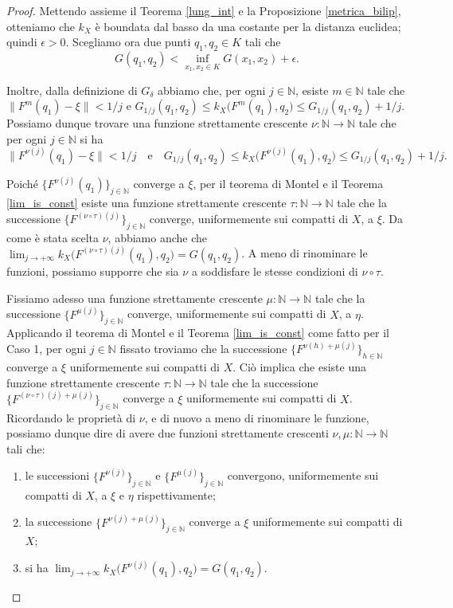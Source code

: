 \begin{proof}
    Mettendo assieme il Teorema \ref{lung_int} e la Proposizione \ref{metrica_bilip}, otteniamo che $k_X$ è boundata dal basso da una costante per la distanza euclidea; quindi $\epsilon>0$. Scegliamo ora due punti $q_1,q_2 \in K$ tali che
    $$G(q_1,q_2)<\inf_{x_1,x_2\in K}G(x_1,x_2)+\epsilon.$$
    
    Inoltre, dalla definizione di $G_{\delta}$ abbiamo che, per ogni $j\in\mathbb{N}$, esiste $m\in\mathbb{N}$ tale che $\|F^m(q_1)-\xi\|<1/j$ e $G_{1/j}(q_1,q_2) \le k_X\big(F^m(q_1),q_2\big) \le G_{1/j}(q_1,q_2)+1/j$. Possiamo dunque trovare una funzione strettamente crescente $\nu:\mathbb{N}\longrightarrow\mathbb{N}$ tale che per ogni $j\in\mathbb{N}$ si ha
    $$\|F^{\nu(j)}(q_1)-\xi\|<1/j \quad\text{e}\quad G_{1/j}(q_1,q_2) \le k_X\big(F^{\nu(j)}(q_1),q_2\big) \le G_{1/j}(q_1,q_2)+1/j.$$

    Poiché $\{F^{\nu(j)}(q_1)\}_{j\in\mathbb{N}}$ converge a $\xi$, per il teorema di Montel e il Teorema \ref{lim_is_const} esiste una funzione strettamente crescente $\tau:\mathbb{N}\longrightarrow\mathbb{N}$ tale che la successione $\{F^{(\nu\circ\tau)(j)}\}_{j\in\mathbb{N}}$ converge, uniformemente sui compatti di $X$, a $\xi$. Da come è stata scelta $\nu$, abbiamo anche che $\displaystyle\lim_{j\longrightarrow+\infty}k_X\big(F^{(\nu\circ\tau)(j)}(q_1),q_2\big)=G(q_1,q_2)$. A meno di rinominare le funzioni, possiamo supporre che sia $\nu$ a soddisfare le stesse condizioni di $\nu\circ\tau$.

    Fissiamo adesso una funzione strettamente crescente $\mu:\mathbb{N}\longrightarrow\mathbb{N}$ tale che la successione $\{F^{\mu(j)}\}_{j\in\mathbb{N}}$ converge, uniformemente sui compatti di $X$, a $\eta$. Applicando il teorema di Montel e il Teorema \ref{lim_is_const} come fatto per il Caso 1, per ogni $j\in\mathbb{N}$ fissato troviamo che la successione $\{F^{\nu(h)+\mu(j)}\}_{h\in\mathbb{N}}$ converge a $\xi$ uniformemente sui compatti di $X$. Ciò implica che esiste una funzione strettamente crescente $\tau:\mathbb{N}\longrightarrow\mathbb{N}$ tale che la successione $\{F^{(\nu\circ\tau)(j)+\mu(j)}\}_{j\in\mathbb{N}}$ converge a $\xi$ uniformemente sui compatti di $X$. Ricordando le proprietà di $\nu$, e di nuovo a meno di rinominare le funzione, possiamo dunque dire di avere due funzioni strettamente crescenti $\nu,\mu:\mathbb{N}\longrightarrow\mathbb{N}$ tali che:
    \begin{enumerate}[label={(\arabic*)}]
        \item le successioni $\{F^{\nu(j)}\}_{j\in\mathbb{N}}$ e $\{F^{\mu(j)}\}_{j\in\mathbb{N}}$ convergono, uniformemente sui compatti di $X$, a $\xi$ e $\eta$ rispettivamente;
        \item la successione $\{F^{\nu(j)+\mu(j)}\}_{j\in\mathbb{N}}$ converge a $\xi$ uniformemente sui compatti di $X$;
        \item si ha $\displaystyle\lim_{j\longrightarrow+\infty}k_X\big(F^{\nu(j)}(q_1),q_2\big)=G(q_1,q_2)$.
    \end{enumerate}


\end{proof}
